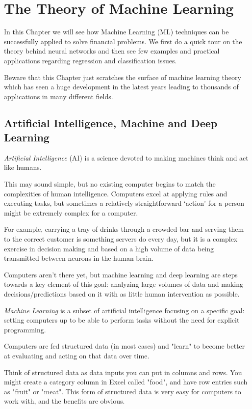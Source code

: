 \chapter{The Theory of Machine Learning}
\label{ch:neural-network}

In this Chapter we will see how Machine Learning (ML) techniques can be successfully applied to solve financial problems. We first do a quick tour on the theory behind neural networks and then see few examples and practical applications regarding regression and classification issues.

Beware that this Chapter just scratches the surface of machine learning theory which has seen a huge development in the latest years leading to thousands of applications in many different fields.

\section{Artificial Intelligence, Machine and Deep Learning}


\emph{Artificial Intelligence} (AI) is a science devoted to making machines think and act like humans. 

This may sound simple, but no existing computer begins to match the complexities of human intelligence. Computers excel at applying rules and executing tasks, but sometimes a relatively straightforward ‘action’ for a person might be extremely complex for a computer.

For example, carrying a tray of drinks through a crowded bar and serving them to the correct customer is something servers do every day, but it is a complex exercise in decision making and based on a high volume of data being transmitted between neurons in the human brain.

Computers aren’t there yet, but machine learning and deep learning are steps towards a key element of this goal: analyzing large volumes of data and making decisions/predictions based on it with as little human intervention as possible.

\emph{Machine Learning} is a subset of artificial intelligence focusing on a specific goal: setting computers up to be able to perform tasks without the need for explicit programming.

Computers are fed structured data (in most cases) and "learn" to become better at evaluating and acting on that data over time. 

Think of structured data as data inputs you can put in columns and rows. You might create a category column in Excel called "food", and have row entries such as "fruit" or "meat". This form of structured data is very easy for computers to work with, and the benefits are obvious. 

